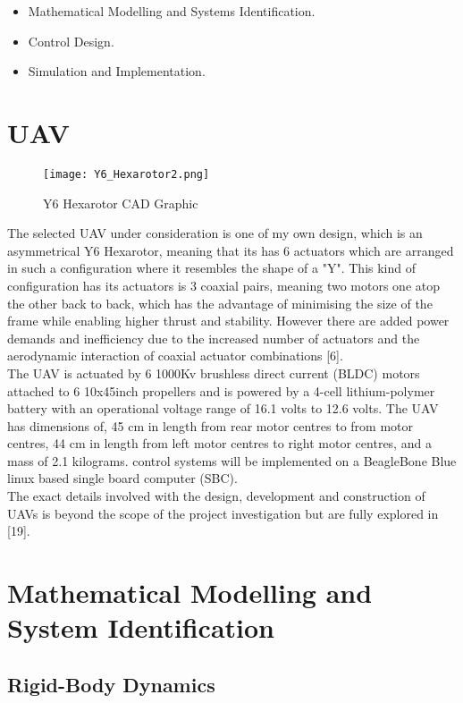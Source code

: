 \documentclass[12pt,a4paper,twoside]{report}
\begin{document}
		\begin{itemize}
			\item 
				Mathematical Modelling and Systems Identification.
			\item
				Control Design.
			\item
				Simulation and Implementation.
		\end{itemize}
				
		\section*{UAV}
			\begin{figure}[h!]
				\centering
				\texttt{[image: Y6\_Hexarotor2.png]}
				\caption{Y6 Hexarotor CAD Graphic}
				\label{fig:Y6Hexarotor}
			\end{figure} 
		
			The selected UAV under consideration is one of my own design, which is an asymmetrical Y6 Hexarotor, meaning that its has 6 actuators which are arranged in such a configuration where it resembles the shape of  a "Y". This kind of configuration has its actuators is 3 coaxial pairs, meaning two motors one atop the other back to back, which has the advantage of minimising the size of the frame while enabling higher thrust and stability. However there are added power demands and inefficiency due to the increased number of actuators and the aerodynamic interaction of coaxial actuator combinations [6].
			\\
			The UAV is actuated by 6 1000Kv brushless direct current (BLDC) motors attached to 6 10x45inch propellers and is powered by a 4-cell lithium-polymer battery with an operational voltage range of 16.1 volts to 12.6 volts. The UAV has dimensions of, 45 cm in length from rear motor centres to from motor centres, 44 cm in length from left motor centres to right motor centres, and a mass of 2.1 kilograms. control systems will be implemented on a BeagleBone Blue linux based single board computer (SBC).
			\\
			The exact details involved with the design, development and construction of UAVs is beyond the scope of the project investigation but are fully explored in [19].
		  
		\section*{Mathematical Modelling and System Identification}
		
			\subsection*{Rigid-Body Dynamics}
			
\end{document}
